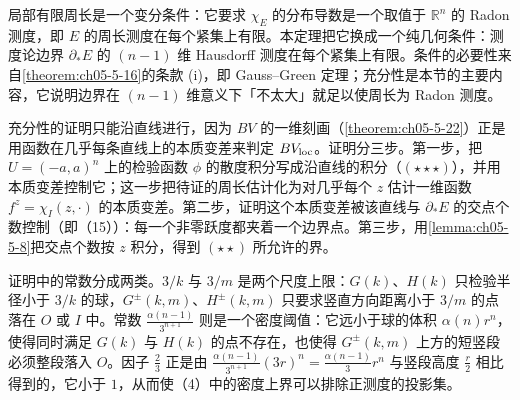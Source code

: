 \documentclass[../../main.tex]{subfiles}%
\begin{document}
\begin{remark}\label{remark:ch05-thm-5-23-动机}
局部有限周长是一个变分条件：它要求 $\chi_E$ 的分布导数是一个取值于 $\mathbb{R}^n$ 的 Radon 测度，即 $E$ 的周长测度在每个紧集上有限。本定理把它换成一个纯几何条件：测度论边界 $\partial_*E$ 的 $(n-1)$ 维 Hausdorff 测度在每个紧集上有限。条件的必要性来自\cref{theorem:ch05-5-16}的条款 (i)，即 Gauss--Green 定理；充分性是本节的主要内容，它说明边界在 $(n-1)$ 维意义下「不太大」就足以使周长为 Radon 测度。%

充分性的证明只能沿直线进行，因为 $BV$ 的一维刻画（\cref{theorem:ch05-5-22}）正是用函数在几乎每条直线上的本质变差来判定 $BV_{\mathrm{loc}}$。证明分三步。第一步，把 $U=(-a,a)^n$ 上的检验函数 $\phi$ 的散度积分写成沿直线的积分（$(\star\star\star)$），并用本质变差控制它；这一步把待证的周长估计化为对几乎每个 $z$ 估计一维函数 $f^z=\chi_I(z,\cdot)$ 的本质变差。第二步，证明这个本质变差被该直线与 $\partial_*E$ 的交点个数控制（即（15））：每一个非零跃度都夹着一个边界点。第三步，用\cref{lemma:ch05-5-8}把交点个数按 $z$ 积分，得到 $(\star\star)$ 所允许的界。%

证明中的常数分成两类。$3/k$ 与 $3/m$ 是两个尺度上限：$G(k)$、$H(k)$ 只检验半径小于 $3/k$ 的球，$G^{\pm}(k,m)$、$H^{\pm}(k,m)$ 只要求竖直方向距离小于 $3/m$ 的点落在 $O$ 或 $I$ 中。常数 $\frac{\alpha(n-1)}{3^{n+1}}$ 则是一个密度阈值：它远小于球的体积 $\alpha(n)r^n$，使得同时满足 $G(k)$ 与 $H(k)$ 的点不存在，也使得 $G^{\pm}(k,m)$ 上方的短竖段必须整段落入 $O$。因子 $\frac23$ 正是由 $\frac{\alpha(n-1)}{3^{n+1}}(3r)^n=\frac{\alpha(n-1)}{3}r^n$ 与竖段高度 $\frac r2$ 相比得到的，它小于 $1$，从而使（4）中的密度上界可以排除正测度的投影集。
\end{remark}
\end{document}
